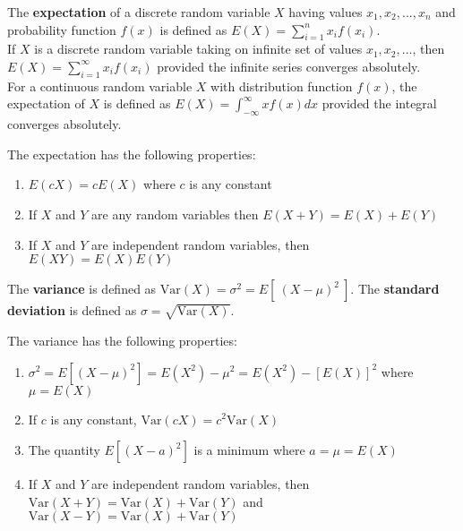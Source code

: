 \begin{defn}
    The \textbf{expectation} of a discrete random variable $X$ having values $x_1, x_2, ..., x_n$ and probability function $f(x)$ is defined as $E\left (X\right ) = \sum_{i=1}^n x_i f\left (x_i\right )$.
    \\

    If $X$ is a discrete random variable taking on infinite set of values $x_1, x_2, ...$, then $E(X) = \sum_{i=1}^\infty x_i f(x_i)$ provided the infinite series converges absolutely.
    \\

    For a continuous random variable $X$ with distribution function $f(x)$, the expectation of $X$ is defined as $E(X) = \int_{- \infty}^\infty x f(x) dx$ provided the integral converges absolutely.
\end{defn}


\begin{samepage}
\begin{thm}
    The expectation has the following properties:

    \begin{enumerate}
        \item $E(c X) = c E(X)$ where $c$ is any constant
        \item If $X$ and $Y$ are any random variables then $E(X + Y) = E(X) + E(Y)$
        \item If $X$ and $Y$ are independent random variables, then $E(XY) = E(X)E(Y)$
    \end{enumerate}
\end{thm}
\end{samepage}

\begin{defn}
    The \textbf{variance} is defined as $\text{Var} (X) = \sigma ^2 = E[ \  (X - \mu)^2 \  ]$.
    The \textbf{standard deviation} is defined as $\sigma = \sqrt{\text{Var} (X)}$.
\end{defn}

\begin{samepage}
\begin{thm}
    The variance has the following properties:

    \begin{enumerate}
        \item $\sigma ^2 = E\left [ \left (X - \mu \right ) ^2 \right ] = E\left (X ^2\right ) - \mu ^2 = E\left (X ^2\right ) - \left [E\left (X\right )\right ] ^2$ where $\mu = E\left (X\right )$
        \item If $c$ is any constant, $\text{Var}(cX) = c^2 \text{Var}(X)$
        \item The quantity $E[ (X - a)^2 ]$ is a minimum where $a = \mu = E(X)$
        \item If $X$ and $Y$ are independent random variables, then \\ $\text{Var}(X+Y) = \text{Var}(X) + \text{Var}(Y)$ and $\text{Var}(X-Y) = \text{Var}(X) + \text{Var}(Y)$
    \end{enumerate}
\end{thm}
\end{samepage}

